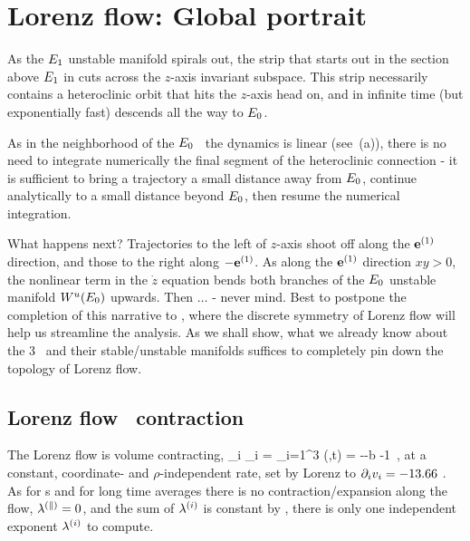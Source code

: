 \section{Lorenz flow: Global portrait}\label{exmp:LorenzGlob}

As the $\EQV{1}$ unstable manifold spirals out,
the strip that starts out in the section above $\EQV{1}$
in  cuts across the
$z$-axis invariant subspace. This strip necessarily contains a
heteroclinic orbit that hits the $z$-axis
head on, and in infinite time (but exponentially
fast) descends all the way to $\EQV{0}$.


 As in the neighborhood of the
$\EQV{0}$ \eqv\ the dynamics is linear
(see \,(a)), there
is no need to integrate numerically the final segment
of the heteroclinic
connection - it is sufficient to bring a trajectory
a small distance away from $\EQV{0}$, continue
analytically to a small distance
beyond $\EQV{0}$,
then resume the numerical integration.

What happens next? Trajectories to the left of $z$-axis shoot
off along the $\jEigvec[1]$ direction, and those to the
right along $-\jEigvec[1]$. As along the $\jEigvec[1]$ direction
$xy >0$, the nonlinear term in the $\dot{z}$ equation 
bends both branches of the
$\EQV{0}$ unstable manifold $W^u(\EQV{0})$ upwards.
Then $\ldots$ - never mind.
Best to postpone the completion of this narrative to
, where the discrete
symmetry of Lorenz flow will help us streamline the analysis.
As we shall show, what we already know about the 3 \eqva\ and
their stable/unstable manifolds suffices to completely pin down
the topology of Lorenz flow.


\subsection{Lorenz flow \statesp\ contraction}\label{exmp:LorenzContr}

The Lorenz flow is volume contracting,
\beq
\pde_i \pVeloc_i
 = \sum_{i=1}^{3} \eigExp[i](\ssp,t)
= -\sigma -b -1
    \,,
at a constant, coordinate- and $\rho$-independent rate, set by
Lorenz to $\pde_i \pVeloc_i = -13.66$ . As for \po s and for
long time averages there is no contraction/expansion along the
flow, $\eigExp[\parallel]=0$, and the sum of $\eigExp[i]$ is
constant by , there is only one independent
exponent $\eigExp[i]$ to compute.


